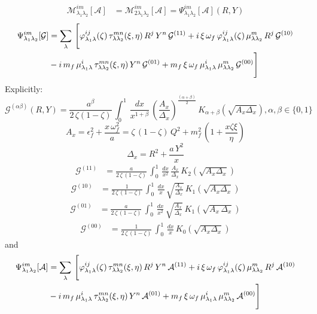 \documentclass[9pt]{article}
\numberwithin{equation}{section}
\begin{document}
\begin{align}
\mathcal{M}^{im}_{\lambda_{1}\lambda_{2}} [\mathcal{A}] & = \mathcal{M}^{im}_{2\lambda_{1}\lambda_{2}} [\mathcal{A}] = \Psi^{im}_{\lambda_{1}\lambda_{2}}[\mathcal{A}](R,Y)
\end{align}
\begin{align}
  \Psi^{im}_{\lambda_{1}\lambda_{2}}[\mathcal{G}] & = \sum_{\lambda}\, \Bigg[\varphi^{ij}_{\lambda_{1}\lambda}(\zeta)\,\tau^{mn}_{\lambda\lambda_{2}}(\xi,\eta)\,R^{j}\,Y^{n}\,\mathcal{G}^{(11)}+i\,\xi\,\omega_{f}\,\varphi^{ij}_{\lambda_{1}\lambda}(\zeta)\,\mu^{m}_{\lambda\lambda_{2}}\,R^{j}\,\mathcal{G}^{(10)}\notag \\ & -i\,m_{f}\,\mu^{i}_{\lambda_{1}\lambda}\,\tau^{mn}_{\lambda\lambda_{2}}(\xi,\eta)\,Y^{n}\,\mathcal{G}^{(01)} + m_{f}\,\xi\,\omega_{f}\,\mu^{i}_{\lambda_{1}\lambda}\,\mu^{m}_{\lambda\lambda_{2}}\,\mathcal{G}^{(00)}\Bigg]  
\end{align}
Explicitly: 
$$\mathcal{G}^{(\alpha\beta)}(R,Y) = \frac{a^{\beta}}{2\,\zeta(1-\zeta)}\,\int_{0}^{1}\, \frac{dx}{x^{1+\beta}}\, \left(\frac{A_{x}}{\Delta_{x}}\right)^{\frac{(\alpha + \beta)}{2}}\,K_{\alpha + \beta} (\sqrt{A_{x}\Delta_{x}}), \alpha, \beta \in \{0,1\}$$
$$A_{x} = \epsilon^{2}_{f} + \frac{x\,\omega^{2}_{f}}{a} = \zeta\,(1-\zeta)\,Q^{2} +m^{2}_{f}\,\left(1+\frac{x\zeta\xi}{\eta}\right)$$
$$\Delta_{x} = R^{2} + \frac{a\,Y^{2}}{x}$$
\begin{align}
    \mathcal{G}^{(11)} & = \frac{a}{2\,\zeta\, (1-\zeta)}\, \int_{0}^{1}\, \frac{dx}{x^{2}}\, \frac{A_{x}}{\Delta_{x}}\,K_{2}\left(\sqrt{A_{x}\Delta_{x}}\right)
\end{align}
\begin{align}
    \mathcal{G}^{(10)} & = \frac{1}{2\, \zeta\, (1-\zeta)}\, \int_{0}^{1}\, \frac{dx}{x}\, \sqrt{\frac{A_{x}}{\Delta_{x}}}\, K_{1}\left(\sqrt{A_{x}\Delta_{x}}\right)
\end{align}
\begin{align}
     \mathcal{G}^{(01)} & = \frac{a}{2\, \zeta\, (1-\zeta)}\, \int_{0}^{1}\, \frac{dx}{x^{2}}\, \sqrt{\frac{A_{x}}{\Delta_{x}}}\, K_{1}\left(\sqrt{A_{x}\,\Delta_{x}}\right)
\end{align}
\begin{align}
     \mathcal{G}^{(00)} & = \frac{1}{2\, \zeta\, (1-\zeta)}\, \int_{0}^{1}\, \frac{dx}{x}\,K_{0}\left(\sqrt{A_{x}\Delta_{x}}\right)
\end{align}
and
\begin{align}
  \Psi^{im}_{\lambda_{1}\lambda_{2}}[\mathcal{A}] & = \sum_{\lambda}\, \Bigg[\varphi^{ij}_{\lambda_{1}\lambda}(\zeta)\,\tau^{mn}_{\lambda\lambda_{2}}(\xi,\eta)\,R^{j}\,Y^{n}\,\mathcal{A}^{(11)}+i\,\xi\,\omega_{f}\,\varphi^{ij}_{\lambda_{1}\lambda}(\zeta)\,\mu^{m}_{\lambda\lambda_{2}}\,R^{j}\,\mathcal{A}^{(10)}\notag \\ & -i\,m_{f}\,\mu^{i}_{\lambda_{1}\lambda}\,\tau^{mn}_{\lambda\lambda_{2}}(\xi,\eta)\,Y^{n}\,\mathcal{A}^{(01)} + m_{f}\,\xi\,\omega_{f}\,\mu^{i}_{\lambda_{1}\lambda}\,\mu^{m}_{\lambda\lambda_{2}}\,\mathcal{A}^{(00)}\Bigg]  
\end{align}
\end{document}
